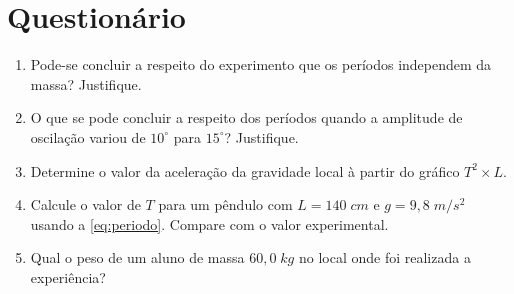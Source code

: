 

\newpage
\section{Questionário}


\begin{enumerate}[leftmargin=*]

\item Pode-se concluir a respeito do experimento que os períodos independem da massa? Justifique.
\anotacoes{2cm}

\item O que se pode concluir a respeito dos períodos quando a amplitude de oscilação variou de $10^{\circ}$ para $15^{\circ}$? Justifique.
\anotacoes{2cm}

\item Determine o valor da aceleração da gravidade local à partir do gráfico $T^2 \times L$.
\anotacoes{2cm}

\item Calcule o valor de $T$ para um pêndulo com $L=140\;cm$ e $g=9,8\;m/s^2$ usando a \autoref{eq:periodo}. Compare com o valor experimental.
\anotacoes{2cm}

\item Qual o peso de um aluno de massa $60,0\;kg$ no local onde foi realizada a experiência?
\anotacoes{2cm}

\end{enumerate}

%


